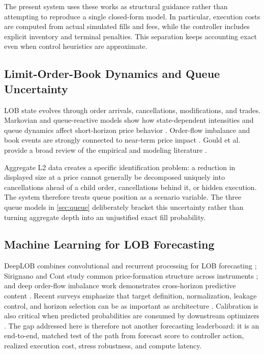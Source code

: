 \documentclass[journal,10pt]{IEEEtran}
\newcommand{\1}{\mathbf{1}}
\begin{document}
The present system uses these works as structural guidance rather than attempting to reproduce a single closed-form model. In particular, execution costs are computed from actual simulated fills and fees, while the controller includes explicit inventory and terminal penalties. This separation keeps accounting exact even when control heuristics are approximate.

\subsection{Limit-Order-Book Dynamics and Queue Uncertainty}
LOB state evolves through order arrivals, cancellations, modifications, and trades. Markovian and queue-reactive models show how state-dependent intensities and queue dynamics affect short-horizon price behavior \cite{ContStoikovTalreja2010,ContDeLarrard2013,HuangLehalleRosenbaum2015}. Order-flow imbalance and book events are strongly connected to near-term price impact \cite{ContKukanovStoikov2014,BouchaudFarmerLillo2009}. Gould et al. provide a broad review of the empirical and modeling literature \cite{GouldPorterWilliamsMcDonaldFennHowison2013}.

Aggregate L2 data creates a specific identification problem: a reduction in displayed size at a price cannot generally be decomposed uniquely into cancellations ahead of a child order, cancellations behind it, or hidden execution. The system therefore treats queue position as a scenario variable. The three queue models in \cref{sec:queue} deliberately bracket this uncertainty rather than turning aggregate depth into an unjustified exact fill probability.

\subsection{Machine Learning for LOB Forecasting}
DeepLOB combines convolutional and recurrent processing for LOB forecasting \cite{ZhangZohrenRoberts2019}; Sirignano and Cont study common price-formation structure across instruments \cite{SirignanoCont2019}; and deep order-flow imbalance work demonstrates cross-horizon predictive content \cite{KolmTurielWestray2023}. Recent surveys emphasize that target definition, normalization, leakage control, and horizon selection can be as important as architecture \cite{BriolaBartolucciAste2025}. Calibration is also critical when predicted probabilities are consumed by downstream optimizers \cite{GuoPleissSunWeinberger2017}. The gap addressed here is therefore not another forecasting leaderboard: it is an end-to-end, matched test of the path from forecast score to controller action, realized execution cost, stress robustness, and compute latency.
\end{document}
